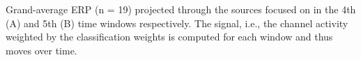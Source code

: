 Grand-average ERP (n = 19) projected through the sources focused on in the 4th (A) and 5th (B) time windows respectively. The signal, i.e., the channel activity weighted by the classification weights is computed for each window and thus moves over time. 
